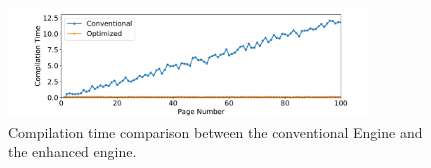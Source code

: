 \documentclass[]{sigchi}
\begin{document}
\begin{figure}[t]
\begin{center}
\includegraphics[width=0.85\textwidth]{figures/time}
\caption{Compilation time comparison between the conventional Engine and the enhanced engine.}
\label{fig:time}
\end{center}
\end{figure}




\end{document}
